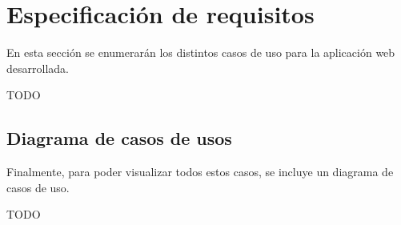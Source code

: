\section{Especificación de requisitos}
\label{sec:Especificación de requisitos}

En esta sección se enumerarán los distintos casos de uso para la aplicación web desarrollada.

TODO


\subsection{Diagrama de casos de usos}
Finalmente, para poder visualizar todos estos casos, se incluye un diagrama de casos de uso.

TODO